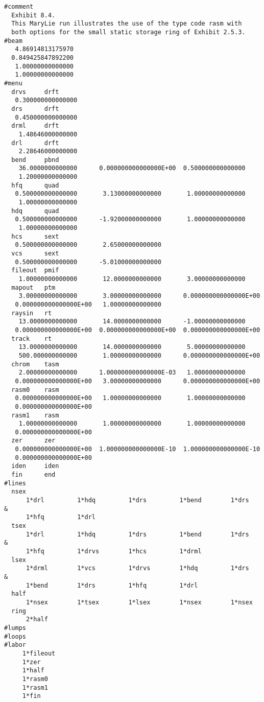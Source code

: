 \vspace{5mm}
\begin{footnotesize}
\begin{verbatim}
#comment
  Exhibit 8.4.
  This MaryLie run illustrates the use of the type code rasm with
  both options for the small static storage ring of Exhibit 2.5.3.
#beam
   4.86914813175970
  0.849425847892200
   1.00000000000000
   1.00000000000000
#menu
  drvs     drft
   0.300000000000000
  drs      drft
   0.450000000000000
  drml     drft
    1.48646000000000
  drl      drft
    2.28646000000000
  bend     pbnd
    36.0000000000000      0.000000000000000E+00  0.500000000000000
    1.20000000000000
  hfq      quad
   0.500000000000000       3.13000000000000       1.00000000000000
    1.00000000000000
  hdq      quad
   0.500000000000000      -1.92000000000000       1.00000000000000
    1.00000000000000
  hcs      sext
   0.500000000000000       2.65000000000000
  vcs      sext
   0.500000000000000      -5.01000000000000
  fileout  pmif
    1.00000000000000       12.0000000000000       3.00000000000000
  mapout   ptm
    3.00000000000000       3.00000000000000      0.000000000000000E+00
   0.000000000000000E+00   1.00000000000000
  raysin   rt
    13.0000000000000       14.0000000000000      -1.00000000000000
   0.000000000000000E+00  0.000000000000000E+00  0.000000000000000E+00
  track    rt
    13.0000000000000       14.0000000000000       5.00000000000000
    500.000000000000       1.00000000000000      0.000000000000000E+00
  chrom    tasm
    2.00000000000000      1.000000000000000E-03   1.00000000000000
   0.000000000000000E+00   3.00000000000000      0.000000000000000E+00
  rasm0    rasm
   0.000000000000000E+00   1.00000000000000       1.00000000000000
   0.000000000000000E+00
  rasm1    rasm
    1.00000000000000       1.00000000000000       1.00000000000000
   0.000000000000000E+00
  zer      zer
   0.000000000000000E+00  1.000000000000000E-10  1.000000000000000E-10
   0.000000000000000E+00
  iden     iden
  fin      end
#lines
  nsex
      1*drl         1*hdq         1*drs         1*bend        1*drs      &
      1*hfq         1*drl
  tsex
      1*drl         1*hdq         1*drs         1*bend        1*drs      &
      1*hfq         1*drvs        1*hcs         1*drml
  lsex
      1*drml        1*vcs         1*drvs        1*hdq         1*drs      &
      1*bend        1*drs         1*hfq         1*drl
  half
      1*nsex        1*tsex        1*lsex        1*nsex        1*nsex
  ring
      2*half
#lumps
#loops
#labor
     1*fileout
     1*zer
     1*half
     1*rasm0
     1*rasm1
     1*fin


\end{verbatim}
\end{footnotesize}
